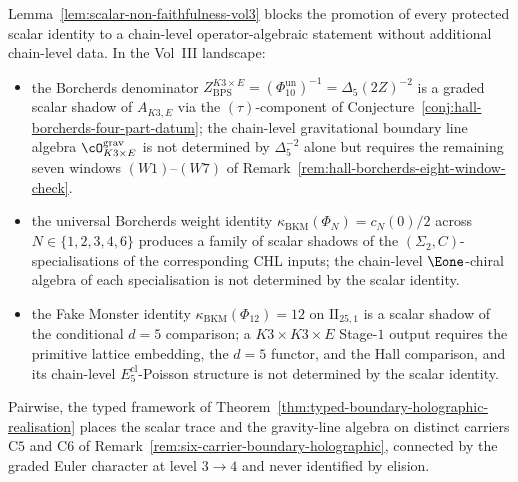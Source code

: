 \begin{remark}
\label{rem:scalar-non-faithfulness-consequences}
Lemma~\ref{lem:scalar-non-faithfulness-vol3} blocks the promotion of every protected scalar identity to a chain-level operator-algebraic statement without additional chain-level data. In the Vol~III landscape:
\begin{itemize}
 \item the Borcherds denominator $Z^{K3 \times E}_{\mathrm{BPS}} = (\Phi_{10}^{\mathrm{un}})^{-1} = \Delta_5(2Z)^{-2}$ is a graded scalar shadow of $A_{K3, E}$ via the $(\tau)$-component of Conjecture~\ref{conj:hall-borcherds-four-part-datum}; the chain-level gravitational boundary line algebra $\cO^{\mathrm{grav}}_{K3 \times E}$ is not determined by $\Delta_5^{-2}$ alone but requires the remaining seven windows $(W1)$--$(W7)$ of Remark~\ref{rem:hall-borcherds-eight-window-check}.
 \item the universal Borcherds weight identity $\kappa_{\mathrm{BKM}}(\Phi_N) = c_N(0)/2$ across $N \in \{1, 2, 3, 4, 6\}$ produces a family of scalar shadows of the $(\Sigma_2, C)$-specialisations of the corresponding CHL inputs; the chain-level $\Eone$-chiral algebra of each specialisation is not determined by the scalar identity.
 \item the Fake Monster identity \(\kappa_{\mathrm{BKM}}(\Phi_{12}) = 12\) on \(\mathrm{II}_{25,1}\) is a scalar shadow of the conditional \(d=5\) comparison; a \(K3 \times K3 \times E\) Stage-\(1\) output requires the primitive lattice embedding, the \(d=5\) functor, and the Hall comparison, and its chain-level \(E_5^{\mathrm{cl}}\)-Poisson structure is not determined by the scalar identity.
\end{itemize}
Pairwise, the typed framework of Theorem~\ref{thm:typed-boundary-holographic-realisation} places the scalar trace and the gravity-line algebra on distinct carriers $\mathrm{C}5$ and $\mathrm{C}6$ of Remark~\ref{rem:six-carrier-boundary-holographic}, connected by the graded Euler character at level $3 \to 4$ and never identified by elision.
\end{remark}

